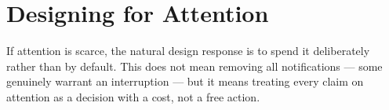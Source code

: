 \documentclass[justified,notoc]{xtufte-book}
\begin{document}
\chapter{Designing for Attention}

If attention is scarce, the natural design response is to spend it
deliberately rather than by default. This does not mean removing all
notifications — some genuinely warrant an interruption — but it means
treating every claim on attention as a decision with a cost, not a
free action.

\printbibliography
\end{document}
